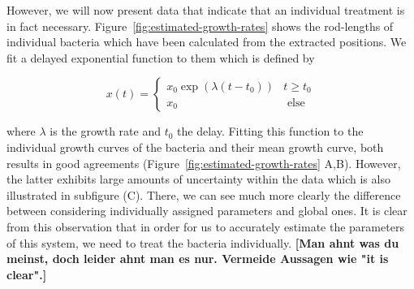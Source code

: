 \documentclass{article}
\begin{document}
However, we will now present data that indicate that an individual treatment is in fact necessary.
Figure~\ref{fig:estimated-growth-rates} shows the rod-lengths of individual bacteria which have been
calculated from the extracted positions.
We fit a delayed exponential function to them which is defined by

\begin{equation}
    x(t) =
    \left\{\begin{array}{ll}
            x_0 \exp(\lambda (t-t_0)) & t\geq t_0\\
            x_0 & \text{ else}
    \end{array}\right.
\end{equation}

where $\lambda$ is the growth rate and $t_0$ the delay.
Fitting this function to the individual growth curves of the bacteria and their mean growth curve,
both results in good agreements (Figure~\ref{fig:estimated-growth-rates} A,B).
However, the latter exhibits large amounts of uncertainty within the data which is also illustrated
in subfigure (C).
There, we can see much more clearly the difference between considering individually assigned
parameters and global ones.
It is clear from this observation that in order for us to accurately estimate the parameters of this
system, we need to treat the bacteria individually.
\textbf{[Man ahnt was du meinst, doch leider ahnt man es nur. Vermeide Aussagen wie "it is clear".]}


\end{document}
